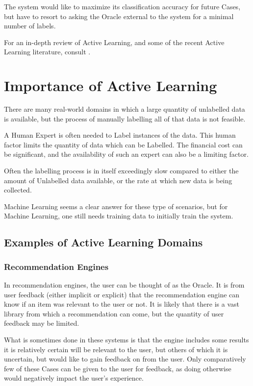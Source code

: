\documentclass[a4paper,11pt]{report}
\begin{document}
The system would like to maximize its classification accuracy for future Cases, but have to resort to asking the Oracle external to the system for a minimal number of labels.

For an in-depth review of Active Learning, and some of the recent Active Learning literature, consult \citet{Settles2010}.

\section{Importance of Active Learning}
There are many real-world domains in which a large quantity of unlabelled data is available, but the process of manually labelling all of that data is not feasible. 

A Human Expert is often needed to Label instances of the data. This human factor limits the quantity of data which can be Labelled. The financial cost can be significant, and the availability of such an expert can also be a limiting factor.

Often the labelling process is in itself exceedingly slow compared to either the amount of Unlabelled data available, or the rate at which new data is being collected. 

Machine Learning seems a clear answer for these type of scenarios, but for Machine Learning, one still needs training data to initially train the system.

\subsection{Examples of Active Learning Domains}
\subsubsection{Recommendation Engines}
In recommendation engines, the user can be thought of as the Oracle. It is from user feedback (either implicit or explicit) that the recommendation engine can know if an item was relevant to the user or not. It is likely that there is a vast library from which a recommendation can come, but the quantity of user feedback may be limited.

What is sometimes done in these systems is that the engine includes some results it is relatively certain will be relevant to the user, but others of which it is uncertain, but would like to gain feedback on from the user. Only comparatively few of these Cases can be given to the user for feedback, as doing otherwise would negatively impact the user's experience.
\end{document}
